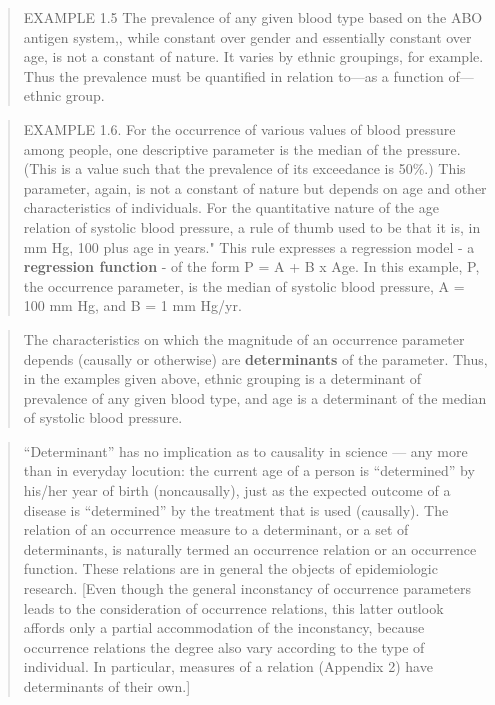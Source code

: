 \documentclass[]{book}
\begin{document}
\begin{quote}
EXAMPLE 1.5 The prevalence of any given blood type based on the ABO antigen system,, while constant over gender and essentially constant over age, is not a constant of nature. It varies by ethnic groupings, for example. Thus the prevalence must be quantified in relation to---as a function of---ethnic group.
\end{quote}

\begin{quote}
EXAMPLE 1.6. For the occurrence of various values of blood pressure among people, one descriptive parameter is the median of the pressure. (This is a value such that the prevalence of its exceedance is 50\%.) This parameter, again, is not a constant of nature but depends on age and other characteristics of individuals. For the quantitative nature of the age relation of systolic blood pressure, a rule of thumb used to be that it is, in mm Hg, 100 plus age in years." This rule expresses a regression model - a \textbf{regression function} - of the form P = A + B x Age. In this example, P, the occurrence parameter, is the median of systolic blood pressure, A = 100 mm Hg, and B = 1 mm Hg/yr.
\end{quote}

\begin{quote}
The characteristics on which the magnitude of an occurrence parameter depends (causally or otherwise) are \textbf{determinants} of the parameter. Thus, in the examples given above, ethnic grouping is a determinant of prevalence of any given blood type, and age is a determinant of the median of systolic blood pressure.
\end{quote}

\begin{quote}
``Determinant'' has no implication as to causality in science --- any more than in everyday locution: the current age of a person is ``determined'' by his/her year of birth (noncausally), just as the expected outcome of a disease is ``determined'' by the treatment that is used (causally). The relation of an occurrence measure to a determinant, or a set of determinants, is naturally termed an occurrence relation or an occurrence function. These relations are in general the objects of epidemiologic research. {[}Even though the general inconstancy of occurrence parameters leads to the consideration of occurrence relations, this latter outlook affords only a partial accommodation of the inconstancy, because occurrence relations the degree also vary according to the type of individual. In particular, measures of a relation (Appendix 2) have determinants of their own.{]}
\end{quote}
\end{document}
